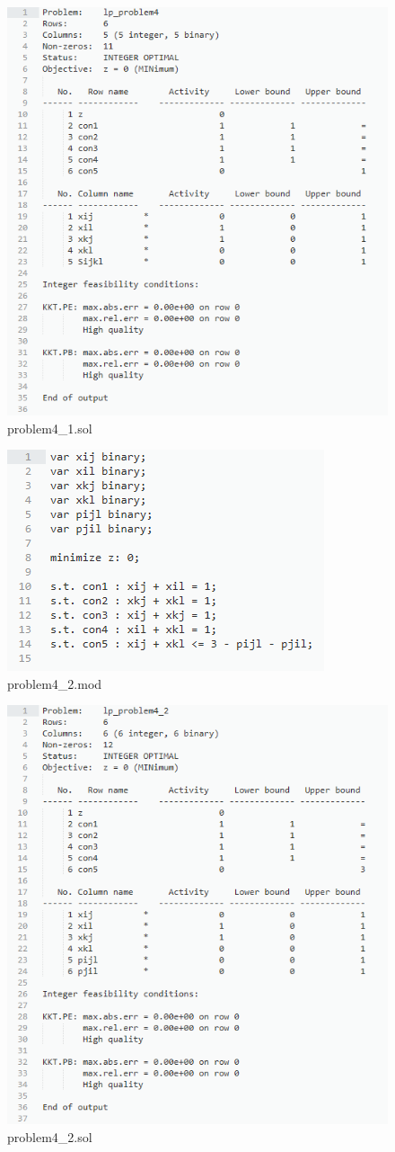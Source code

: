 \documentclass{article}
\begin{document}
\begin{figure}
	\centering
	\includegraphics[width=0.7\linewidth]{problem4_1sol.png}
	\caption{problem4\_1.sol} 
\end{figure}

\begin{figure}
	\centering
	\includegraphics[width=0.4\linewidth]{problem4_2mod.png}
	\caption{problem4\_2.mod} 
\end{figure}

\begin{figure}
	\centering
	\includegraphics[width=0.7\linewidth]{problem4_2sol.png}
	\caption{problem4\_2.sol} 
\end{figure}
\end{document}
